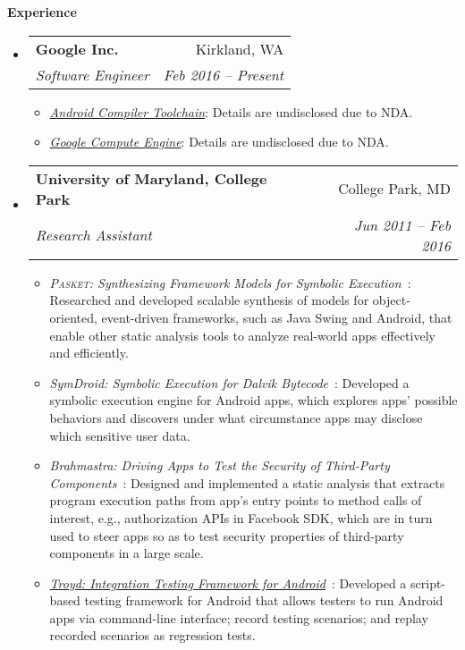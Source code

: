 \documentclass[letterpaper,11pt]{article}
\makeatletter
\newcommand{\resheading}[1]{{\large \colorbox{mygrey}{\begin{minipage}{\textwidth}{\textbf{#1 \vphantom{p\^{E}}}}\end{minipage}}}}
\newcommand{\ressubheading}[4]{
\begin{tabular*}{6.5in}{l@{\extracolsep{\fill}}r}
    \textbf{#1} & #2 \\
    \textit{#3} & \textit{#4} \\
\end{tabular*}\vspace{-6pt}}
\makeatother
\begin{document}
\resheading{Experience}
  \begin{itemize}
    \item
      \ressubheading{{Google Inc.}}{Kirkland, WA}{Software Engineer}{Feb 2016 -- Present}
        {
\small
        \begin{itemize}
\item\emph{\href{https://developer.android.com/studio/preview/index.html}{Android Compiler Toolchain}}:
Details are undisclosed due to NDA.

\item\emph{\href{https://cloud.google.com/compute/}{Google Compute Engine}}:
Details are undisclosed due to NDA.
        \end{itemize}
        }
    \item
      \ressubheading{{University of Maryland, College Park}}{College Park, MD}{Research Assistant}{Jun 2011 -- Feb 2016}
        {
\small
        \begin{itemize}
\item\emph{\textsc{Pasket}: Synthesizing Framework Models for Symbolic Execution}~\cite{FMSD17, icse16, fse15, cav15, popl14, jsk-tr}:
Researched and developed scalable synthesis of models for object-oriented,
event-driven frameworks, such as Java Swing and Android,
that enable other static analysis tools
to analyze real-world apps effectively and efficiently.

\item\emph{SymDroid: Symbolic Execution for Dalvik Bytecode}~\cite{esorics15, esorics15-tr, symdroid}:
Developed a symbolic execution engine for Android apps,
which explores apps' possible behaviors and
discovers under what circumstance apps may disclose which sensitive user data.

\item\emph{Brahmastra: Driving Apps to Test the Security of Third-Party Components}~\cite{security14}:
Designed and implemented a static analysis that extracts program execution paths
from app's entry points to method calls of interest, e.g., authorization APIs
in Facebook SDK, which are in turn used to steer apps so as to test
security properties of third-party components in a large scale.

\item\emph{\href{https://github.com/plum-umd/troyd}{Troyd: Integration Testing Framework for Android}}~\cite{troyd}:
Developed a script-based testing framework for Android
that allows testers to run Android apps via command-line interface;
record testing scenarios; and replay recorded scenarios as regression tests.


\end{itemize}}
\end{itemize}
\end{document}
